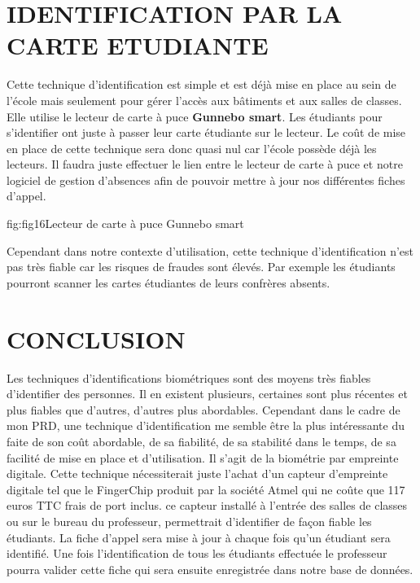 \documentclass[overfullbox]{polytech/polytech}
\begin{document}
\section{IDENTIFICATION PAR LA CARTE ETUDIANTE}

Cette technique d'identification est simple et est déjà mise en place au sein de l'école mais seulement pour gérer l'accès aux bâtiments et aux salles de classes. Elle utilise le lecteur de carte à puce \textbf{Gunnebo smart}. Les étudiants pour s'identifier ont juste à passer leur carte étudiante sur le lecteur. Le coût de mise en place de cette technique  sera donc quasi nul car l'école possède déjà les lecteurs.  Il faudra juste effectuer le lien entre le lecteur de carte à puce et notre logiciel de gestion d'absences afin de pouvoir mettre à jour nos différentes fiches d'appel.  

\begin{Figure}{fig:fig16}{Lecteur de carte à puce Gunnebo smart}
\end{Figure}

Cependant dans notre contexte d'utilisation, cette technique d'identification n'est pas très fiable car les risques de fraudes sont élevés. Par exemple les étudiants pourront scanner les cartes étudiantes de leurs confrères absents. 


\section{CONCLUSION}

Les techniques d'identifications biométriques sont des moyens très fiables d'identifier des personnes. Il en existent plusieurs, certaines sont plus récentes et plus fiables que d'autres, d'autres plus abordables. Cependant dans le cadre de mon PRD, une technique d'identification me semble être la plus intéressante du faite de son coût abordable, de sa fiabilité, de sa stabilité dans le temps, de sa facilité de mise en place et d'utilisation. Il s'agit de la biométrie par empreinte digitale. Cette technique nécessiterait juste l'achat d'un capteur d'empreinte digitale tel que le FingerChip produit par la société Atmel qui ne coûte que 117 euros TTC frais de port inclus. ce capteur installé à l'entrée des salles de classes ou sur le bureau du professeur, permettrait d'identifier de façon fiable les étudiants. La fiche d'appel sera mise à jour à chaque fois qu'un étudiant sera identifié. Une fois l'identification de tous les étudiants effectuée le professeur pourra valider cette fiche qui sera ensuite enregistrée dans notre base de données. 
\end{document}
